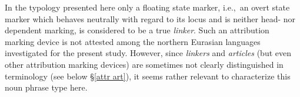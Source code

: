 In the typology presented here only a floating state marker, i.e.,~an overt state marker which behaves neutrally with regard to its locus and is neither head- nor dependent marking, is considered to be a true \emph{linker}. Such an attribution marking device is not attested among the northern Eurasian languages investigated for the present study. However, since \emph{linkers} and \emph{articles} (but even other attribution marking devices) are sometimes not clearly distinguished in terminology (see below \S\ref{attr art}), it seems rather relevant to characterize this noun phrase type here.

